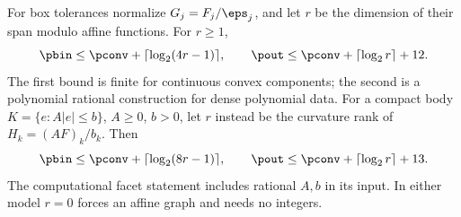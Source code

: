 \begin{theorem}\label{thm:vector-rank}
For box tolerances normalize $G_j=F_j/\eps_j$, and let $r$ be the
dimension of their span modulo affine functions. For $r\ge1$,
\begin{equation}\label{eq:vector-box-rank}
 \pbin\le\pconv+\lceil\log_2(4r-1)\rceil,
 \qquad
 \pout\le\pconv+\lceil\log_2r\rceil+12.
\end{equation}
The first bound is finite for continuous convex components; the second
is a polynomial rational construction for dense polynomial data.
For a compact body $K=\{e:A|e|\le b\}$, $A\ge0$, $b>0$, let $r$ instead
be the curvature rank of $H_k=(AF)_k/b_k$. Then
\begin{equation}\label{eq:vector-facet-rank}
 \pbin\le\pconv+\lceil\log_2(8r-1)\rceil,
 \qquad
 \pout\le\pconv+\lceil\log_2r\rceil+13.
\end{equation}
The computational facet statement includes rational $A,b$ in its input.
In either model $r=0$ forces an affine graph and needs no integers.
\end{theorem}
